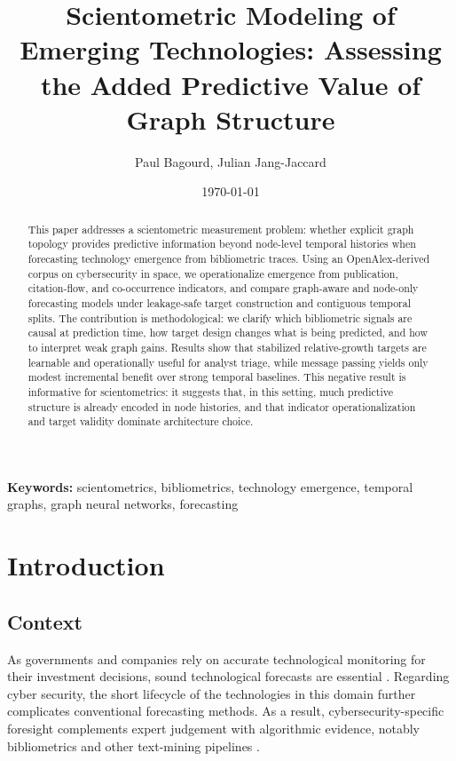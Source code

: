 \documentclass[pdflatex,sn-basic]{sn-jnl}
\title{Scientometric Modeling of Emerging Technologies: Assessing the Added Predictive Value of Graph Structure}
\author{Paul Bagourd, Julian Jang-Jaccard}
\date{\today}
\begin{document}
\maketitle


\begin{abstract}
This paper addresses a scientometric measurement problem: whether explicit graph topology provides predictive information beyond node-level temporal histories when forecasting technology emergence from bibliometric traces. Using an OpenAlex-derived corpus on cybersecurity in space, we operationalize emergence from publication, citation-flow, and co-occurrence indicators, and compare graph-aware and node-only forecasting models under leakage-safe target construction and contiguous temporal splits. The contribution is methodological: we clarify which bibliometric signals are causal at prediction time, how target design changes what is being predicted, and how to interpret weak graph gains. Results show that stabilized relative-growth targets are learnable and operationally useful for analyst triage, while message passing yields only modest incremental benefit over strong temporal baselines. This negative result is informative for scientometrics: it suggests that, in this setting, much predictive structure is already encoded in node histories, and that indicator operationalization and target validity dominate architecture choice.
\end{abstract}
\textbf{Keywords:} scientometrics, bibliometrics, technology emergence, temporal graphs, graph neural networks, forecasting
\newpage
\section{Introduction}

\subsection{Context}

As governments and companies rely on accurate technological monitoring for their investment decisions, sound technological forecasts are essential \cite{coccia2005technometrics,lee2021review,haleem2019tf,calleja2020forecasting}. Regarding cyber security, the short lifecycle of the technologies in this domain further complicates conventional forecasting methods.
As a result, cybersecurity-specific foresight complements expert judgement with algorithmic evidence, notably bibliometrics and other text-mining pipelines \cite{daim2016anticipating,dotsika2017disruptive,singer2014cybersecurity}.
\end{document}
